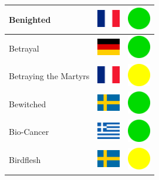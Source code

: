 \documentclass[12pt, a4paper, twoside]{report}
\begin{document}
\begin{center}
\begin{longtable}{|p{5cm}|p{2cm}|p{2cm}|}
 Benighted                                                  & \includegraphics[width=1cm]{../4x3/fr} &   \includegraphics[width=1cm]{../likes/y} \\ \hline
 Betrayal                                                   & \includegraphics[width=1cm]{../4x3/de} &   \includegraphics[width=1cm]{../likes/y} \\ \hline
 Betraying the Martyrs                                      & \includegraphics[width=1cm]{../4x3/fr} &   \includegraphics[width=1cm]{../likes/m} \\ \hline
 Bewitched                                                  & \includegraphics[width=1cm]{../4x3/se} &   \includegraphics[width=1cm]{../likes/y} \\ \hline
 Bio-Cancer                                                 & \includegraphics[width=1cm]{../4x3/gr} &   \includegraphics[width=1cm]{../likes/y} \\ \hline
 Birdflesh                                                  & \includegraphics[width=1cm]{../4x3/se} &   \includegraphics[width=1cm]{../likes/m} \\ \hline

\end{longtable}
\end{center}
\end{document}
